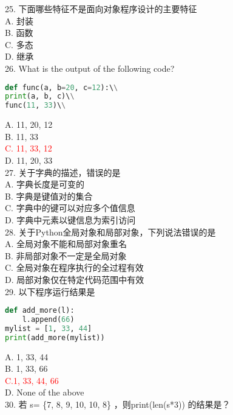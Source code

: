 \documentclass[6pt]{article}
\begin{document}
25. 下面哪些特征不是面向对象程序设计的主要特征\\

A. 封装\\
B. 函数\\
C. 多态\\
D. 继承\\

26. What is the output of the following code?\\
\begin{lstlisting}[language=Python]
def func(a, b=20, c=12):\\
print(a, b, c)\\
func(11, 33)\\
\end{lstlisting}
A. 11, 20, 12\\
B. 11, 33\\
\textcolor{red}{C. 11, 33, 12}\\
D. 11, 20, 33\\

27. 关于字典的描述，错误的是\\

A. 字典长度是可变的\\
B. 字典是键值对的集合\\
C. 字典中的键可以对应多个值信息\\
D. 字典中元素以键信息为索引访问\\

28. 关于Python全局对象和局部对象，下列说法错误的是\\

A. 全局对象不能和局部对象重名\\
B. 非局部对象不一定是全局对象\\
C. 全局对象在程序执行的全过程有效\\
D. 局部对象仅在特定代码范围中有效\\

29. 以下程序运行结果是\\

\begin{lstlisting}[language=Python]
def add_more(l): 
    l.append(66)   
mylist = [1, 33, 44] 
print(add_more(mylist))
\end{lstlisting}
A.	1, 33, 44\\
B.	1, 33, 66\\
\textcolor{red}{C.1, 33, 44, 66}\\
D.	None of the above\\

30.   若 s= \{7, 8, 9, 10, 10, 8\} ，则print(len(s*3)) 的结果是？\\
\end{document}
